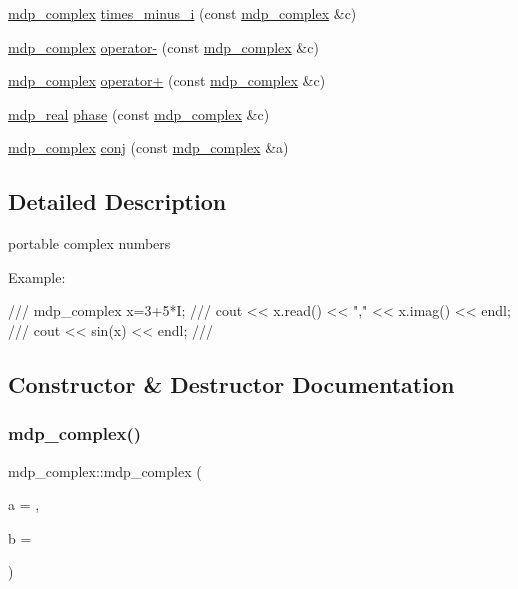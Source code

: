 \begin{DoxyCompactItemize}
\item 
\hyperlink{classmdp__complex}{mdp\+\_\+complex} \hyperlink{classmdp__complex_a0ccefb1f54f375c0f2e23c6f26ecdbbe}{times\+\_\+minus\+\_\+i} (const \hyperlink{classmdp__complex}{mdp\+\_\+complex} \&c)
\item 
\hyperlink{classmdp__complex}{mdp\+\_\+complex} \hyperlink{classmdp__complex_a9dbd08dfce91bbc62f7e1b2926a63dcd}{operator-\/} (const \hyperlink{classmdp__complex}{mdp\+\_\+complex} \&c)
\item 
\hyperlink{classmdp__complex}{mdp\+\_\+complex} \hyperlink{classmdp__complex_addd8f88607b984dd6642d8f6785d2d5c}{operator+} (const \hyperlink{classmdp__complex}{mdp\+\_\+complex} \&c)
\item 
\hyperlink{mdp__global__vars_8h_a69d96b74c791e0bbdb888b3913a69450}{mdp\+\_\+real} \hyperlink{classmdp__complex_a54c5a00e1f1f36c105a4587431fd2dab}{phase} (const \hyperlink{classmdp__complex}{mdp\+\_\+complex} \&c)
\item 
\hyperlink{classmdp__complex}{mdp\+\_\+complex} \hyperlink{classmdp__complex_a87d03a17271a85f700b7fa512c3e7db7}{conj} (const \hyperlink{classmdp__complex}{mdp\+\_\+complex} \&a)
\end{DoxyCompactItemize}


\subsection{Detailed Description}
portable complex numbers 

Example\+: \begin{DoxyVerb}///    mdp_complex x=3+5*I;
///    cout << x.read() << "," << x.imag() << endl;
///    cout << sin(x) << endl;
/// \end{DoxyVerb}
 

\subsection{Constructor \& Destructor Documentation}
\mbox{\label{classmdp__complex_aeb3ec4ef78af98be64dc82c9a2105820}} 
\subsubsection{\texorpdfstring{mdp\+\_\+complex()}{mdp\_complex()}\hspace{0.1cm}{\footnotesize\ttfamily [1/2]}}
{\footnotesize\ttfamily mdp\+\_\+complex\+::mdp\+\_\+complex (\begin{DoxyParamCaption}\item[{const \hyperlink{mdp__global__vars_8h_a69d96b74c791e0bbdb888b3913a69450}{mdp\+\_\+real}}]{a = {},  }\item[{const \hyperlink{mdp__global__vars_8h_a69d96b74c791e0bbdb888b3913a69450}{mdp\+\_\+real}}]{b = {} }\end{DoxyParamCaption})\hspace{0.3cm}{\ttfamily [inline]}}

